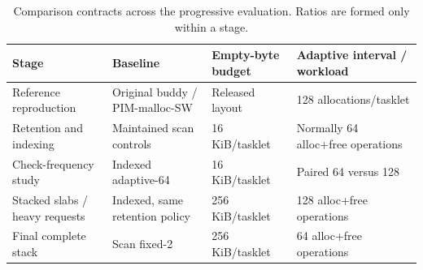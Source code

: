 \begin{table}[t]
\caption{Comparison contracts across the progressive evaluation. Ratios are formed only within a stage.}\label{tab:stages}
\centering\small
\begin{tabular}{@{}p{}p{}p{}p{}@{}}\toprule
Stage & Baseline & Empty-byte budget & Adaptive interval / workload \\ \midrule
Reference reproduction & Original buddy / PIM-malloc-SW & Released layout & 128 allocations/tasklet \\
Retention and indexing & Maintained scan controls & 16 KiB/tasklet & Normally 64 alloc+free operations \\
Check-frequency study & Indexed adaptive-64 & 16 KiB/tasklet & Paired 64 versus 128 \\
Stacked slabs / heavy requests & Indexed, same retention policy & 256 KiB/tasklet & 128 alloc+free operations \\
Final complete stack & Scan fixed-2 & 256 KiB/tasklet & 64 alloc+free operations \\
\bottomrule\end{tabular}
\end{table}
